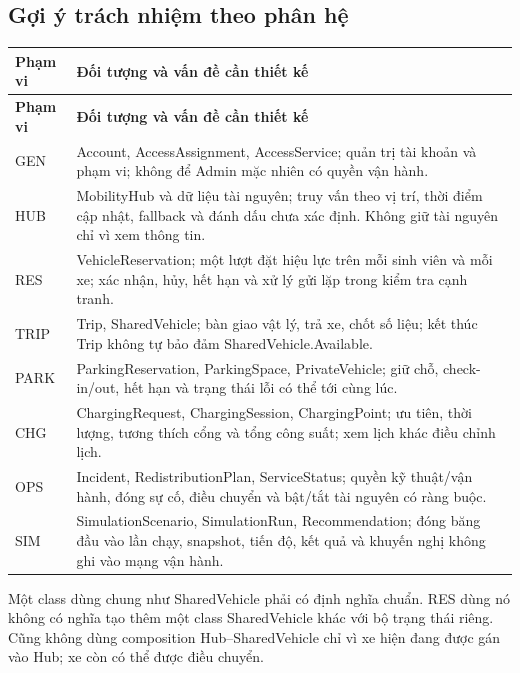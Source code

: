 \subsection{Gợi ý trách nhiệm theo phân hệ}
\begin{longtable}{|L{20mm}|L{121mm}|}\hline
\textbf{Phạm vi} & \textbf{Đối tượng và vấn đề cần thiết kế}\\\hline
\endfirsthead
\hline
\textbf{Phạm vi} & \textbf{Đối tượng và vấn đề cần thiết kế}\\\hline
\endhead
GEN & Account, AccessAssignment, AccessService; quản trị tài khoản và phạm vi; không để Admin mặc nhiên có quyền vận hành.\\\hline
HUB & MobilityHub và dữ liệu tài nguyên; truy vấn theo vị trí, thời điểm cập nhật, fallback và đánh dấu chưa xác định. Không giữ tài nguyên chỉ vì xem thông tin.\\\hline
RES & VehicleReservation; một lượt đặt hiệu lực trên mỗi sinh viên và mỗi xe; xác nhận, hủy, hết hạn và xử lý gửi lặp trong kiểm tra cạnh tranh.\\\hline
TRIP & Trip, SharedVehicle; bàn giao vật lý, trả xe, chốt số liệu; kết thúc Trip không tự bảo đảm SharedVehicle.Available.\\\hline
PARK & ParkingReservation, ParkingSpace, PrivateVehicle; giữ chỗ, check-in/out, hết hạn và trạng thái lỗi có thể tới cùng lúc.\\\hline
CHG & ChargingRequest, ChargingSession, ChargingPoint; ưu tiên, thời lượng, tương thích cổng và tổng công suất; xem lịch khác điều chỉnh lịch.\\\hline
OPS & Incident, RedistributionPlan, ServiceStatus; quyền kỹ thuật/vận hành, đóng sự cố, điều chuyển và bật/tắt tài nguyên có ràng buộc.\\\hline
SIM & SimulationScenario, SimulationRun, Recommendation; đóng băng đầu vào lần chạy, snapshot, tiến độ, kết quả và khuyến nghị không ghi vào mạng vận hành.\\\hline
\end{longtable}

Một class dùng chung như SharedVehicle phải có định nghĩa chuẩn. RES dùng nó không có nghĩa tạo thêm một class SharedVehicle khác với bộ trạng thái riêng. Cũng không dùng composition Hub--SharedVehicle chỉ vì xe hiện đang được gán vào Hub; xe còn có thể được điều chuyển.

